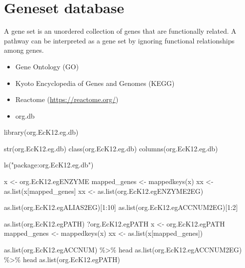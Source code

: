 \documentclass[
]{book}
\newenvironment{Shaded}{\begin{snugshade}}{\end{snugshade}}
\newcommand{\DecValTok}[1]{\textcolor[rgb]{0.00,0.00,0.81}{#1}}
\newcommand{\FunctionTok}[1]{\textcolor[rgb]{0.00,0.00,0.00}{#1}}
\newcommand{\NormalTok}[1]{#1}
\newcommand{\OtherTok}[1]{\textcolor[rgb]{0.56,0.35,0.01}{#1}}
\newcommand{\SpecialCharTok}[1]{\textcolor[rgb]{0.00,0.00,0.00}{#1}}
\newcommand{\StringTok}[1]{\textcolor[rgb]{0.31,0.60,0.02}{#1}}
\providecommand{\tightlist}{%
  \setlength{\itemsep}{0pt}\setlength{\parskip}{0pt}}
\begin{document}
\hypertarget{geneset-database}{%
\section{Geneset database}\label{geneset-database}}

A gene set is an unordered collection of genes that are functionally related. A pathway can be interpreted as a gene set by ignoring functional relationships among genes.

\begin{itemize}
\tightlist
\item
  Gene Ontology (GO)
\item
  Kyoto Encyclopedia of Genes and Genomes (KEGG)
\item
  Reactome (\url{https://reactome.org/})
\item
  org.db
\end{itemize}

\begin{Shaded}
\begin{Highlighting}[]
\FunctionTok{library}\NormalTok{(org.EcK12.eg.db)}

\FunctionTok{str}\NormalTok{(org.EcK12.eg.db)}
\FunctionTok{class}\NormalTok{(org.EcK12.eg.db)}
\FunctionTok{columns}\NormalTok{(org.EcK12.eg.db)}

\FunctionTok{ls}\NormalTok{(}\StringTok{"package:org.EcK12.eg.db"}\NormalTok{)}

\NormalTok{x }\OtherTok{\textless{}{-}}\NormalTok{ org.EcK12.egENZYME}
\NormalTok{mapped\_genes }\OtherTok{\textless{}{-}} \FunctionTok{mappedkeys}\NormalTok{(x)}
\NormalTok{xx }\OtherTok{\textless{}{-}} \FunctionTok{as.list}\NormalTok{(x[mapped\_genes]}
\NormalTok{xx }\OtherTok{\textless{}{-}} \FunctionTok{as.list}\NormalTok{(org.EcK12.egENZYME2EG)}
              
\FunctionTok{as.list}\NormalTok{(org.EcK12.egALIAS2EG)[}\DecValTok{1}\SpecialCharTok{:}\DecValTok{10}\NormalTok{]}
\FunctionTok{as.list}\NormalTok{(org.EcK12.egACCNUM2EG)[}\DecValTok{1}\SpecialCharTok{:}\DecValTok{2}\NormalTok{]}


\FunctionTok{as.list}\NormalTok{(org.EcK12.egPATH)}
\NormalTok{?org.EcK12.egPATH}
\NormalTok{x }\OtherTok{\textless{}{-}}\NormalTok{ org.EcK12.egPATH}
\NormalTok{mapped\_genes }\OtherTok{\textless{}{-}} \FunctionTok{mappedkeys}\NormalTok{(x)}
\NormalTok{xx }\OtherTok{\textless{}{-}} \FunctionTok{as.list}\NormalTok{(x[mapped\_genes])}

\FunctionTok{as.list}\NormalTok{(org.EcK12.egACCNUM) }\SpecialCharTok{\%\textgreater{}\%}\NormalTok{ head}
\FunctionTok{as.list}\NormalTok{(org.EcK12.egACCNUM2EG) }\SpecialCharTok{\%\textgreater{}\%}\NormalTok{ head}
\FunctionTok{as.list}\NormalTok{(org.EcK12.egPATH)}
\end{Highlighting}
\end{Shaded}
\end{document}
